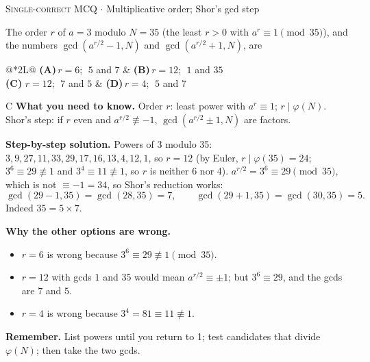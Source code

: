 \documentclass[11pt,a4paper]{article}
\newcommand{\optlabel}[1]{\textbf{(#1)}}
\newcommand{\correctlabel}[1]{\textcolor{okgreen}{\textbf{(#1)}\,\ding{51}}}
\newenvironment{qitem}[1]{\begin{list}{}{\setlength{\leftmargin}{3.3em}\setlength{\labelwidth}{3.1em}%
  \setlength{\labelsep}{0.2em}\setlength{\topsep}{3pt}\setlength{\parsep}{3pt}}\item[\textbf{Q.#1}\hfill]}{\end{list}}
\newcommand{\qsep}{\par\vspace{2pt}{\color{black!15}\hrule}\vspace{4pt}}
\newcommand{\qmeta}[2]{{\footnotesize\color{black!60}\textsc{#1} \;$\cdot$\; #2}\par}
\begin{document}
\begin{qitem}{8}
\qmeta{Single-correct MCQ}{Multiplicative order; Shor's gcd step}
The order $r$ of $a = 3$ modulo $N = 35$ (the least $r > 0$ with $a^r \equiv 1 \pmod{35}$), and the numbers
$\gcd(a^{r/2} - 1, N)$ and $\gcd(a^{r/2} + 1, N)$, are
\par\smallskip\noindent\begin{tabularx}{\linewidth}{@{}*{2}{L}@{}}
\optlabel{A}\,$r = 6$; $\;5$ and $7$ & \optlabel{B}\,$r = 12$; $\;1$ and $35$ \\[3pt]
\correctlabel{C}\,$r = 12$; $\;7$ and $5$ & \optlabel{D}\,$r = 4$; $\;5$ and $7$
\end{tabularx}
\end{qitem}
\begin{solbox}{C}
\textbf{\color{brand}What you need to know.} Order $r$: least power with $a^r \equiv 1$; $r \mid \varphi(N)$. Shor's step: if $r$ even and $a^{r/2} \not\equiv -1$, $\gcd(a^{r/2}\pm1, N)$ are factors.

\textbf{\color{brand}Step-by-step solution.} Powers of 3 modulo 35: $3, 9, 27, 11, 33, 29, 17, 16, 13, 4, 12, 1$, so $r = 12$ (by Euler, $r \mid \varphi(35) = 24$;
$3^{6} \equiv 29 \not\equiv 1$ and $3^{4} \equiv 11 \not\equiv 1$, so $r$ is neither 6 nor 4).
$a^{r/2} = 3^6 \equiv 29 \pmod{35}$, which is not $\equiv -1 = 34$, so Shor's reduction works:
\[ \gcd(29 - 1, 35) = \gcd(28, 35) = 7, \qquad \gcd(29 + 1, 35) = \gcd(30, 35) = 5 . \]
Indeed $35 = 5 \times 7$.

\textbf{\color{brand}Why the other options are wrong.}
\begin{itemize}[leftmargin=2.4em, itemsep=1pt, topsep=2pt]
\item[\textbf{(A)}] $r = 6$ is wrong because $3^6 \equiv 29 \not\equiv 1 \pmod{35}$.
\item[\textbf{(B)}] $r = 12$ with gcds $1$ and $35$ would mean $a^{r/2} \equiv \pm1$; but $3^6 \equiv 29$, and the gcds are $7$ and $5$.
\item[\textbf{(D)}] $r = 4$ is wrong because $3^4 = 81 \equiv 11 \not\equiv 1$.
\end{itemize}
\textbf{\color{brand}Remember.} List powers until you return to 1; test candidates that divide $\varphi(N)$; then take the two gcds.
\end{solbox}
\qsep
\end{document}

